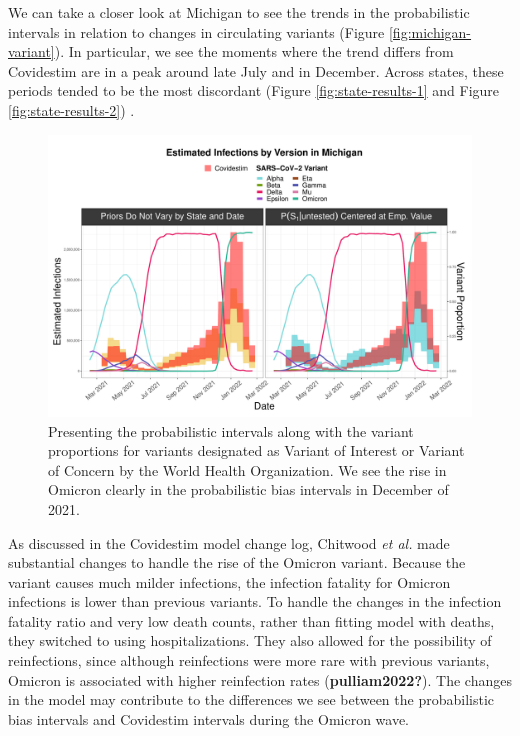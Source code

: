 \documentclass[12pt,twoside]{smiththesis}
\begin{document}
We can take a closer look at Michigan to see the trends in the probabilistic intervals in relation to changes in circulating variants (Figure \ref{fig:michigan-variant}). In particular, we see the moments where the trend differs from Covidestim are in a peak around late July and in December. Across states, these periods tended to be the most discordant (Figure \ref{fig:state-results-1} and Figure \ref{fig:state-results-2}) .
\begin{figure}
\includegraphics[width=1\linewidth]{figure/michigan_variant} \caption{\label{fig:michigan-variant}Presenting the probabilistic intervals along with the variant proportions for variants designated as Variant of Interest or Variant of Concern by the World Health Organization. We see the rise in Omicron clearly in the probabilistic bias intervals in December of 2021.}\label{fig:unnamed-chunk-7}
\end{figure}
As discussed in the Covidestim model change log, Chitwood \emph{et al.} made substantial changes to handle the rise of the Omicron variant. Because the variant causes much milder infections, the infection fatality for Omicron infections is lower than previous variants. To handle the changes in the infection fatality ratio and very low death counts, rather than fitting model with deaths, they switched to using hospitalizations. They also allowed for the possibility of reinfections, since although reinfections were more rare with previous variants, Omicron is associated with higher reinfection rates (\textbf{pulliam2022?}). The changes in the model may contribute to the differences we see between the probabilistic bias intervals and Covidestim intervals during the Omicron wave.
\end{document}
